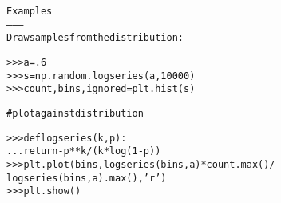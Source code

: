 \begin{boxedminipage}{\funcwidth}
\begin{alltt}
Examples
--------
Draw samples from the distribution:

{\textgreater}{\textgreater}{\textgreater} a = .6
{\textgreater}{\textgreater}{\textgreater} s = np.random.logseries(a, 10000)
{\textgreater}{\textgreater}{\textgreater} count, bins, ignored = plt.hist(s)

\#   plot against distribution

{\textgreater}{\textgreater}{\textgreater} def logseries(k, p):
...     return -p**k/(k*log(1-p))
{\textgreater}{\textgreater}{\textgreater} plt.plot(bins, logseries(bins, a)*count.max()/
             logseries(bins, a).max(), 'r')
{\textgreater}{\textgreater}{\textgreater} plt.show()
\end{alltt}

\setlength{\parskip}{1ex}
    \end{boxedminipage}

    \label{trunk:qstkutil:bollinger:multinomial}

    \vspace{0.5ex}

